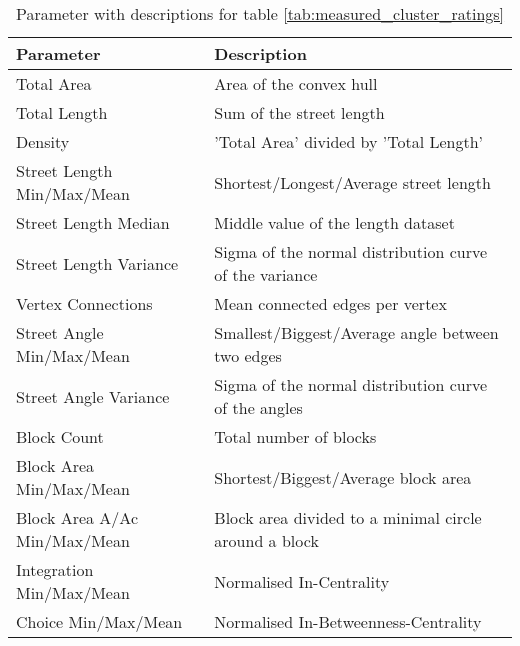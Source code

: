 \begin{table}[h]
\begin{center}
    \begin{tabular}{ | l | l |} \hline 
        \textbf{Parameter} & \textbf{Description} \\
        \hline
        Total Area &  Area of the convex hull \\ \hline
        Total Length & Sum of the street length \\ \hline
        Density & 'Total Area' divided by 'Total Length'  \\ \hline
        
        Street Length Min/Max/Mean & Shortest/Longest/Average street length  \\ \hline
        Street Length Median & Middle value of the length dataset \\ \hline
        Street Length Variance & Sigma of the normal distribution curve of the variance \\ \hline
        
        Vertex Connections & Mean connected edges per vertex  \\ \hline
        
        Street Angle Min/Max/Mean & Smallest/Biggest/Average angle between two edges \\ \hline
        Street Angle Variance & Sigma of the normal distribution curve of the angles \\ \hline
        
        Block Count & Total number of blocks \\ \hline
        Block Area Min/Max/Mean & Shortest/Biggest/Average block area \\ \hline
        Block Area A/Ac Min/Max/Mean & Block area divided to a minimal circle around a block \\ \hline
        
        Integration Min/Max/Mean & Normalised In-Centrality \\ \hline
        Choice Min/Max/Mean & Normalised In-Betweenness-Centrality \\ \hline
    \end{tabular}
    \caption{Parameter with descriptions for table \ref{tab:measured_cluster_ratings}}
    \label{tab:cluterAnalysisDescription}
\end{center}
\end{table}


